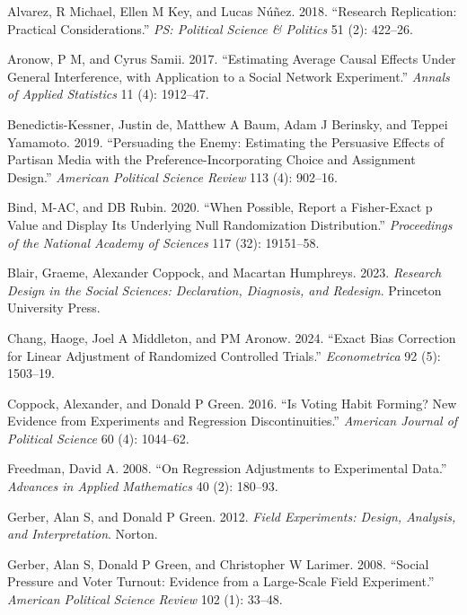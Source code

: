 \documentclass[
  10pt,
  a4paper,10pt]{extarticle}
\newlength{\cslhangindent}
\newenvironment{CSLReferences}[2] %
 {\begin{list}{}{%
  \setlength{\itemindent}{0pt}
  \setlength{\leftmargin}{0pt}
  \setlength{\parsep}{0pt}
  \ifodd #1
   \setlength{\leftmargin}{\cslhangindent}
   \setlength{\itemindent}{-1\cslhangindent}
  \fi
  \setlength{\itemsep}{#2\baselineskip}}}
 {\end{list}}
\begin{document}
\label{refs}
\begin{CSLReferences}{1}{0}
Alvarez, R Michael, Ellen M Key, and Lucas Núñez. 2018. {``Research
Replication: Practical Considerations.''} \emph{PS: Political Science \&
Politics} 51 (2): 422--26.

Aronow, P M, and Cyrus Samii. 2017. {``Estimating Average Causal Effects
Under General Interference, with Application to a Social Network
Experiment.''} \emph{Annals of Applied Statistics} 11 (4): 1912--47.

Benedictis-Kessner, Justin de, Matthew A Baum, Adam J Berinsky, and
Teppei Yamamoto. 2019. {``Persuading the Enemy: Estimating the
Persuasive Effects of Partisan Media with the Preference-Incorporating
Choice and Assignment Design.''} \emph{American Political Science
Review} 113 (4): 902--16.

Bind, M-AC, and DB Rubin. 2020. {``When Possible, Report a Fisher-Exact
p Value and Display Its Underlying Null Randomization Distribution.''}
\emph{Proceedings of the National Academy of Sciences} 117 (32):
19151--58.

Blair, Graeme, Alexander Coppock, and Macartan Humphreys. 2023.
\emph{Research Design in the Social Sciences: Declaration, Diagnosis,
and Redesign}. Princeton University Press.

Chang, Haoge, Joel A Middleton, and PM Aronow. 2024. {``Exact Bias
Correction for Linear Adjustment of Randomized Controlled Trials.''}
\emph{Econometrica} 92 (5): 1503--19.

Coppock, Alexander, and Donald P Green. 2016. {``Is Voting Habit
Forming? New Evidence from Experiments and Regression
Discontinuities.''} \emph{American Journal of Political Science} 60 (4):
1044--62.

Freedman, David A. 2008. {``On Regression Adjustments to Experimental
Data.''} \emph{Advances in Applied Mathematics} 40 (2): 180--93.

Gerber, Alan S, and Donald P Green. 2012. \emph{Field Experiments:
Design, Analysis, and Interpretation}. Norton.

Gerber, Alan S, Donald P Green, and Christopher W Larimer. 2008.
{``Social Pressure and Voter Turnout: Evidence from a Large-Scale Field
Experiment.''} \emph{American Political Science Review} 102 (1): 33--48.


\end{CSLReferences}
\end{document}
